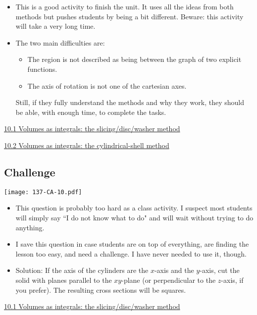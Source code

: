 \documentclass[11pt]{article}
\newcommand{\nl}{\hfill \vspace{-1.1\baselineskip}} %
\newcommand{\vi}{\hspace{8mm}\href{https://www.youtube.com/watch?v=Kq9Q5LISo5o&list=PLlwePzQY_wW9f22c89JAQBzaa-9XgESA8}{10.1 Volumes as integrals: the slicing/disc/washer method}}
\newcommand{\vii}{\hspace{8mm}\href{https://www.youtube.com/watch?v=YYM9URJ4iJ8&list=PLlwePzQY_wW9f22c89JAQBzaa-9XgESA8&index=2}{10.2 Volumes as integrals: the cylindrical-shell method}}
\begin{document}
\begin{comments}
\nl
	\begin{itemize}
		\item  This is a good activity to finish the unit.  It uses all the ideas from both methods but pushes students by being a bit different.  Beware: this activity will take a very long time.
		\item  The two main difficulties are:
			\begin{itemize}
				\item  The region is not described as being between the graph of two explicit functions.
				\item  The axis of rotation is not one of the cartesian axes.
			\end{itemize}
			Still, if they fully understand the methods and why they work, they should be able, with enough time, to complete the tasks.
	\end{itemize}
\end{comments}

\begin{videos}
\vi

\vii
\end{videos}

\newpage
\subsection{Challenge}

\begin{center}
{ \texttt{[image: 137-CA-10.pdf]}} 
\end{center}

\begin{comments}
\nl
	\begin{itemize}
		\item This question is probably too hard as a class activity.  I suspect most students will simply say ``I do not know what to do" and will wait without trying to do anything.  
		\item I save this question in case students are on top of everything, are finding the lesson too easy, and need a challenge.  I have never needed to use it, though.
		\item Solution: If the axis of the cylinders are the $x$-axis and the $y$-axis, cut the solid with planes parallel to the $xy$-plane (or perpendicular to the $z$-axis, if you prefer).  The resulting cross sections will be squares.
	\end{itemize}
\end{comments}

\begin{videos}
\vi
\end{videos}

\newpage
\end{document}
